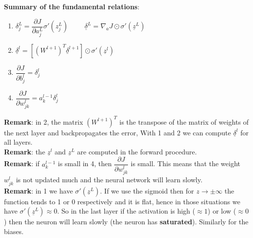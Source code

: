 \textbf{Summary of the fundamental relations}:
\begin{enumerate}
    \item $\delta_j^L = \dfrac{\partial J}{\partial a_j^L} \sigma'(z_j^L) \hspace{1cm} \underline{\delta}^L = \nabla_a J \odot \sigma'(\underline{z}^L)$
    \item $\underline{\delta}^l = \left[(W^{l+1})^T \underline{\delta}^{l+1}\right] \odot \sigma'(\underline{z}^l)$
    \item $\dfrac{\partial J}{\partial b_j^l} = \delta_j^l$
    \item $\dfrac{\partial J}{\partial w_{jk}^l} = a_k^{l-1} \delta_j^l$
\end{enumerate}
\textbf{Remark}: in 2, the matrix $(W^{l+1})^T$ is the transpose of the matrix of weights of the next layer and backpropagates the error, With 1 and 2 we can compute $\underline{\delta}^l$ for all layers.\\

\noindent\textbf{Remark}: the $\underline{z}^l$ and $\underline{z}^L$ are computed in the forward procedure.\\

\noindent\textbf{Remark}: if $a_k^{l-1}$ is small in 4, then $\dfrac{\partial J}{\partial w_{jk}^l}$ is small. This means that the weight $w_{jk}^l$ is not updated much and the neural network will learn slowly.\\

\noindent\textbf{Remark}: in 1 we have $\sigma'(\underline{z}^L)$. If we use the sigmoid then for $z \to \pm \infty$ the function tends to 1 or 0 respectively and it is flat, hence in those situations we have $\sigma'(\underline{z}^L) \approx 0$. So in the last layer if the activation is high ($\approx 1$) or low ($\approx 0$) then the neuron will learn slowly (the neuron has \textbf{saturated}). Similarly for the biases.


